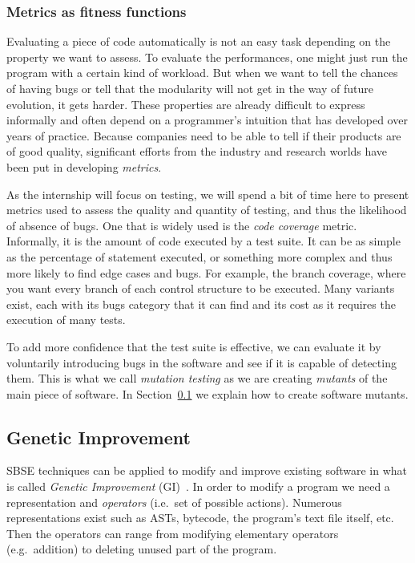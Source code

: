 \documentclass[11pt]{sdm}
\begin{document}
\subsubsection{Metrics as fitness functions}
\label{fitness_func}
Evaluating a piece of code automatically is not an easy task depending on the property we want to assess.
To evaluate the performances, one might just run the program with a certain kind of workload.
But when we want to tell the chances of having bugs or tell that the modularity will not get in the way of future evolution, it gets harder.
These properties are already difficult to express informally and often depend on a programmer's intuition that has developed over years of practice.
Because companies need to be able to tell if their products are of good quality, significant efforts from the industry and research worlds have been put in developing \textit{metrics}.

As the internship will focus on testing, we will spend a bit of time here to present metrics used to assess the quality and quantity of testing, and thus the likelihood of absence of bugs.
One that is widely used is the \textit{code coverage} metric.
Informally, it is the amount of code executed by a test suite.
It can be as simple as the percentage of statement executed, or something more complex and thus more likely to find edge cases and bugs.
For example, the branch coverage, where you want every branch of each control structure to be executed.
Many variants exist, each with its bugs category that it can find and its cost as it requires the execution of many tests.

To add more confidence that the test suite is effective, we can evaluate it by voluntarily introducing bugs in the software and see if it is capable of detecting them.
This is what we call \textit{mutation testing} as we are creating \textit{mutants} of the main piece of software.
In Section~\ref{applications} we explain how to create software mutants.

\subsection{Genetic Improvement}
\label{applications}
SBSE techniques can be applied to modify and improve existing software in what is called \textit{Genetic Improvement} (GI)~\cite{petke2017genetic}.
In order to modify a program we need a representation and \textit{operators} (i.e.\ set of possible actions).
Numerous representations exist such as ASTs, bytecode, the program's text file itself, etc.
Then the operators can range from modifying elementary operators (e.g.\ addition) to deleting unused part of the program.
\end{document}
